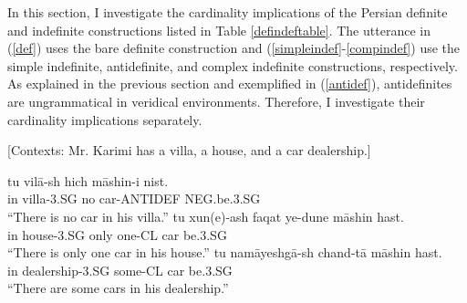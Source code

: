 \documentclass{salt}
\begin{document}

In this section, I investigate the cardinality implications of the Persian definite and indefinite constructions listed in Table \ref{defindeftable}. The utterance in (\ref{def}) uses the bare definite construction and (\ref{simpleindef}-\ref{compindef}) use the simple indefinite, antidefinite, and complex indefinite constructions, respectively. As explained in the previous section and exemplified in (\ref{antidef}), antidefinites are ungrammatical in veridical environments. Therefore, I investigate their cardinality implications  separately. 

\begin {exe}
	\ex \label {contexts} {[\footnotesize Contexts: Mr. Karimi has a villa, a house, and a car dealership.]} \begin {xlist}
		\ex \label{villa}
			\gll	tu	vil\={a}-sh	hich 	m\={a}shin-i	nist.\\
				in	villa-{\scriptsize 3.SG} 	no	car-{\scriptsize ANTIDEF} 		{\scriptsize NEG.}be{\scriptsize .3.SG}\\
			``There is no car in his villa.''
		\ex \label{house}
			\gll	tu	xun(e)-ash		faqat 	ye-dune	m\={a}shin	hast.\\
				in	house-{\scriptsize 3.SG} 	only		one-{\scriptsize CL}	car		be{\scriptsize .3.SG}\\
			``There is only one car in his house.''
		\ex \label{dealer}
			\gll	tu	nam\={a}yeshg\={a}-sh	chand-t\={a}	m\={a}shin	hast.\\
				in	dealership-{\scriptsize 3.SG} 	some-{\scriptsize CL}	car 		be{\scriptsize .3.SG}\\
			``There are some cars in his dealership.''

	\end {xlist}
\end {exe}
\end{document}
